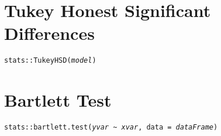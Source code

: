 \documentclass{tufte-handout}
\begin{document}
\vspace{5mm}
\section{Tukey Honest Significant Differences }
\noindent \texttt{stats::}{\color{red}\texttt{TukeyHSD}}\texttt{(\textit{model})}

\vspace{5mm}
\section{Bartlett Test}
\noindent \texttt{stats::}{\color{red}\texttt{bartlett.test}}\texttt{(\textit{yvar} \textasciitilde\ \textit{xvar}, data = \textit{dataFrame})}

\end{document}
